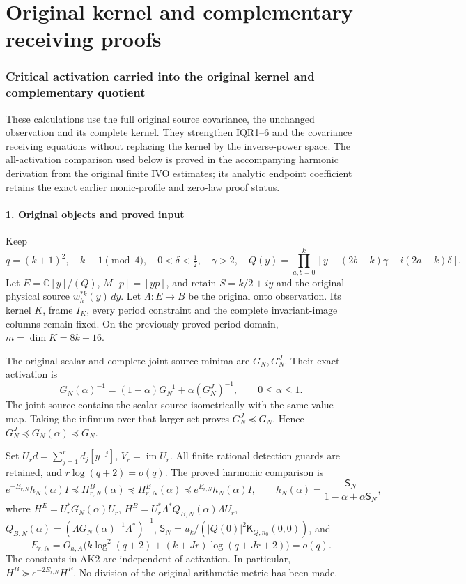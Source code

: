 \documentclass[11pt]{article}
\begin{document}
\clearpage\part{Original kernel and complementary receiving proofs}
\section{Critical activation carried into the original kernel and complementary quotient}\label{critical-activation-carried-into-the-original-kernel-and-complementary-quotient}

These calculations use the full original source covariance, the unchanged observation and its complete kernel. They strengthen IQR1--6 and the covariance receiving equations without replacing the kernel by the inverse-power space. The all-activation comparison used below is proved in the accompanying harmonic derivation from the original finite IVO estimates; its analytic endpoint coefficient retains the exact earlier monic-profile and zero-law proof status.

\subsection{1. Original objects and proved input}\label{original-objects-and-proved-input}

Keep \[
q=(k+1)^2,\quad k\equiv1\pmod4,\quad 0<\delta<\tfrac12,\quad\gamma>2,
\quad Q(y)=\prod_{a,b=0}^k[y-(2b-k)\gamma+i(2a-k)\delta].
\] Let \(E=\mathbb C[y]/(Q)\), \(M[p]=[yp]\), and retain \(S=k/2+iy\) and the original physical source \(w_h^{*k}(y)\,dy\). Let \(\Lambda:E\to B\) be the original onto observation. Its kernel \(K\), frame \(I_K\), every period constraint and the complete invariant-image columns remain fixed. On the previously proved period domain, \(m=\dim K=8k-16\).

The original scalar and complete joint source minima are \(G_N,G_N^J\). Their exact activation is \[
G_N(\alpha)^{-1}=(1-\alpha)G_N^{-1}+\alpha(G_N^J)^{-1},
\qquad 0\le\alpha\le1. \tag{AK1}
\] The joint source contains the scalar source isometrically with the same value map. Taking the infimum over that larger set proves \(G_N^J\preceq G_N\). Hence \(G_N^J\preceq G_N(\alpha)\preceq G_N\).

Set \(U_rd=\sum_{j=1}^rd_j[y^{-j}]\), \(V_r=\operatorname{im}U_r\). All finite rational detection guards are retained, and \(r\log(q+2)=o(q)\). The proved harmonic comparison is \[
e^{-E_{r,N}}h_N(\alpha)I
 \preceq H^B_{r,N}(\alpha)\preceq H^E_{r,N}(\alpha)
 \preceq e^{E_{r,N}}h_N(\alpha)I,\qquad
h_N(\alpha)=\frac{\mathsf S_N}{1-\alpha+\alpha\mathsf S_N},
\tag{AK2}
\] where \(H^E=U_r^*G_N(\alpha)U_r\), \(H^B=U_r^*\Lambda^*Q_{B,N}(\alpha)\Lambda U_r\), \(Q_{B,N}(\alpha)=(\Lambda G_N(\alpha)^{-1}\Lambda^*)^{-1}\), \(\mathsf S_N=u_k/(|Q(0)|^2\mathsf K_{Q,n_0}(0,0))\), and \[
E_{r,N}=O_{h,A}\bigl(k\log^2(q+2)+(k+Jr)\log(q+Jr+2)\bigr)=o(q).
\] The constants in AK2 are independent of activation. In particular, \(H^B\succeq e^{-2E_{r,N}}H^E\). No division of the original arithmetic metric has been made.
\end{document}
